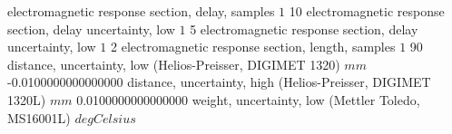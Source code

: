 \expandafter\def\csname oct2tex.param.ersdel.d\endcsname{electromagnetic response section, delay, samples}
\expandafter\def\csname oct2tex.param.ersdel.u\endcsname{\ensuremath{1}}
\expandafter\def\csname oct2tex.param.ersdel.v\endcsname{10}
\expandafter\def\csname oct2tex.param.ersdeluc1.d\endcsname{electromagnetic response section, delay uncertainty, low}
\expandafter\def\csname oct2tex.param.ersdeluc1.u\endcsname{\ensuremath{1}}
\expandafter\def\csname oct2tex.param.ersdeluc1.v\endcsname{5}
\expandafter\def\csname oct2tex.param.ersdeluc2.d\endcsname{electromagnetic response section, delay uncertainty, low}
\expandafter\def\csname oct2tex.param.ersdeluc2.u\endcsname{\ensuremath{1}}
\expandafter\def\csname oct2tex.param.ersdeluc2.v\endcsname{2}
\expandafter\def\csname oct2tex.param.erslen.d\endcsname{electromagnetic response section, length, samples}
\expandafter\def\csname oct2tex.param.erslen.u\endcsname{\ensuremath{1}}
\expandafter\def\csname oct2tex.param.erslen.v\endcsname{90}
\expandafter\def\csname oct2tex.param.distuc1.d\endcsname{distance, uncertainty, low (Helios-Preisser, DIGIMET 1320)}
\expandafter\def\csname oct2tex.param.distuc1.u\endcsname{\ensuremath{mm}}
\expandafter\def\csname oct2tex.param.distuc1.v\endcsname{-0.0100000000000000}
\expandafter\def\csname oct2tex.param.distuc2.d\endcsname{distance, uncertainty, high (Helios-Preisser, DIGIMET 1320L)}
\expandafter\def\csname oct2tex.param.distuc2.u\endcsname{\ensuremath{mm}}
\expandafter\def\csname oct2tex.param.distuc2.v\endcsname{0.0100000000000000}
\expandafter\def\csname oct2tex.param.wghtuc1.d\endcsname{weight, uncertainty, low (Mettler Toledo, MS16001L)}
\expandafter\def\csname oct2tex.param.wghtuc1.u\endcsname{\ensuremath{deg Celsius}}
